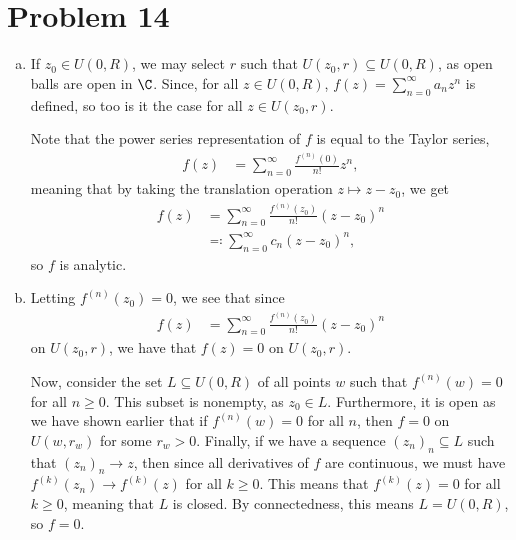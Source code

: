 \documentclass[10pt]{mypackage}
\begin{document}
\section{Problem 14}%
\begin{enumerate}[(a)]
  \item If $z_0\in U\left( 0,R \right)$, we may select $r$ such that $U\left( z_0,r \right)\subseteq U\left( 0,R \right)$, as open balls are open in $\C$. Since, for all $z\in U\left( 0,R \right)$, $f(z)=\sum_{n=0}^{\infty}a_nz^{n}$ is defined, so too is it the case for all $z\in U\left( z_0,r \right)$.\newline

    Note that the power series representation of $f$ is equal to the Taylor series,
    \begin{align*}
      f(z) &= \sum_{n=0}^{\infty} \frac{f^{(n)}(0)}{n!} z^{n},
    \end{align*}
    meaning that by taking the translation operation $z\mapsto z-z_0$, we get
    \begin{align*}
      f(z) &= \sum_{n=0}^{\infty}\frac{f^{(n)}\left( z_0 \right)}{n!} \left( z-z_0 \right)^{n}\\
           &\eqcolon \sum_{n=0}^{\infty} c_n\left( z-z_0 \right)^{n},
    \end{align*}
    so $f$ is analytic.
  \item Letting $f^{(n)}\left(z_0\right) = 0$, we see that since
    \begin{align*}
      f(z) &= \sum_{n=0}^{\infty}\frac{f^{(n)}\left( z_0 \right)}{n!}\left( z-z_0 \right)^{n}
    \end{align*}
    on $U\left( z_0,r \right)$, we have that $f(z) = 0$ on $U\left( z_0,r \right)$.\newline

    Now, consider the set $L\subseteq U\left( 0,R \right)$ of all points $w$ such that $f^{(n)}(w) = 0$ for all $n\geq 0$. This subset is nonempty, as $z_0\in L$. Furthermore, it is open as we have shown earlier that if $f^{(n)}(w) = 0$ for all $n$, then $f = 0$ on $U\left( w,r_{w} \right)$ for some $r_{w} > 0$. Finally, if we have a sequence $\left( z_n \right)_n\subseteq L$ such that $\left( z_n \right)_n\rightarrow z$, then since all derivatives of $f$ are continuous, we must have $f^{(k)}\left( z_n \right) \rightarrow f^{(k)}\left( z \right)$ for all $k\geq 0$. This means that $f^{(k)}\left( z \right) = 0$ for all $k\geq 0$, meaning that $L$ is closed. By connectedness, this means $L = U\left( 0,R \right)$, so $f = 0$.
\end{enumerate}
\end{document}
